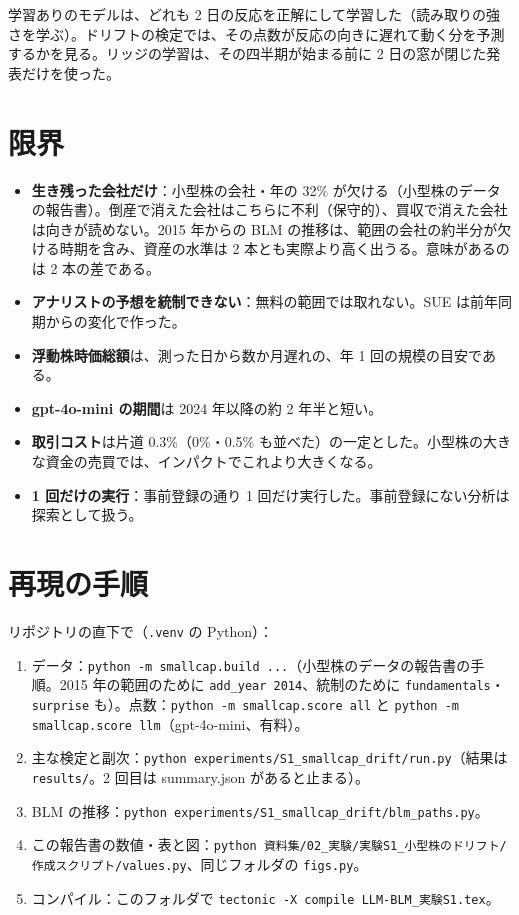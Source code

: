 \documentclass[xelatex,ja=standard,jafont=haranoaji,a4paper,10pt,openany]{bxjsreport}
\newcommand{\code}[1]{\texttt{#1}}
\begin{document}
学習ありのモデルは、どれも 2 日の反応を正解にして学習した（読み取りの強さを学ぶ）。ドリフトの検定では、その点数が反応の向きに遅れて動く分を予測するかを見る。リッジの学習は、その四半期が始まる前に 2 日の窓が閉じた発表だけを使った。



\chapter{限界}\label{ch:limits}

\begin{itemize}
\item \textbf{生き残った会社だけ}：小型株の会社・年の 32\% が欠ける（小型株のデータの報告書）。倒産で消えた会社はこちらに不利（保守的）、買収で消えた会社は向きが読めない。2015 年からの BLM の推移は、範囲の会社の約半分が欠ける時期を含み、資産の水準は 2 本とも実際より高く出うる。意味があるのは 2 本の差である。
\item \textbf{アナリストの予想を統制できない}：無料の範囲では取れない。SUE は前年同期からの変化で作った。
\item \textbf{浮動株時価総額}は、測った日から数か月遅れの、年 1 回の規模の目安である。
\item \textbf{gpt-4o-mini の期間}は 2024 年以降の約 2 年半と短い。
\item \textbf{取引コスト}は片道 0.3\%（0\%・0.5\% も並べた）の一定とした。小型株の大きな資金の売買では、インパクトでこれより大きくなる。
\item \textbf{1 回だけの実行}：事前登録の通り 1 回だけ実行した。事前登録にない分析は探索として扱う。
\end{itemize}

\chapter*{再現の手順}

リポジトリの直下で（\code{.venv} の Python）：

\begin{enumerate}
\item データ：\code{python -m smallcap.build ...}（小型株のデータの報告書の手順。2015 年の範囲のために \code{add\_year 2014}、統制のために \code{fundamentals}・\code{surprise} も）。点数：\code{python -m smallcap.score all} と \code{python -m smallcap.score llm}（gpt-4o-mini、有料）。
\item 主な検定と副次：\code{python experiments/S1\_smallcap\_drift/run.py}（結果は \code{results/}。2 回目は summary.json があると止まる）。
\item BLM の推移：\code{python experiments/S1\_smallcap\_drift/blm\_paths.py}。
\item この報告書の数値・表と図：\code{python 資料集/02\_実験/実験S1\_小型株のドリフト/作成スクリプト/values.py}、同じフォルダの \code{figs.py}。
\item コンパイル：このフォルダで \code{tectonic -X compile LLM-BLM\_実験S1.tex}。
\end{enumerate}
\end{document}
